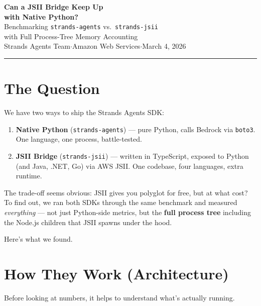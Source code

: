 \documentclass[11pt]{article}
\begin{document}
\begin{center}
\vspace*{0.2em}
{\huge\bfseries\sffamily\color{sectionblue} Can a JSII Bridge Keep Up\\[4pt] with Native Python?}\\[10pt]
{\Large\color{textgray}\sffamily Benchmarking \texttt{strands-agents} vs.\ \texttt{strands-jsii}\\[2pt] with Full Process-Tree Memory Accounting}\\[10pt]
{\large\sffamily Strands Agents Team\quad$\cdot$\quad Amazon Web Services\quad$\cdot$\quad March 4, 2026}\\[6pt]
\color{chartgray}\rule{0.6\textwidth}{0.5pt}
\end{center}
\vspace{0.3em}

\section{The Question}

We have two ways to ship the Strands Agents SDK:

\begin{enumerate}[leftmargin=2em]
\item \textbf{Native Python} (\texttt{strands-agents}) — pure Python, calls Bedrock via \texttt{boto3}. One language, one process, battle-tested.

\item \textbf{JSII Bridge} (\texttt{strands-jsii}) — written in TypeScript, exposed to Python (and Java, .NET, Go) via AWS JSII. One codebase, four languages, extra runtime.
\end{enumerate}

The trade-off seems obvious: JSII gives you polyglot for free, but at what cost? To find out, we ran both SDKs through the same benchmark and measured \textit{everything} — not just Python-side metrics, but the \textbf{full process tree} including the Node.js children that JSII spawns under the hood.

Here's what we found.

\section{How They Work (Architecture)}

Before looking at numbers, it helps to understand what's actually running.
\end{document}
